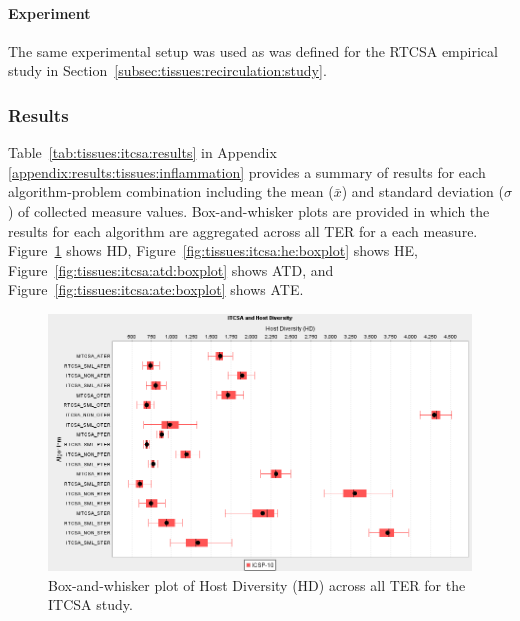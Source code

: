 \paragraph{Experiment}
The same experimental setup was used as was defined for the RTCSA empirical study in Section~\ref{subsec:tissues:recirculation:study}.

%
%
\subsubsection{Results}
Table~\ref{tab:tissues:itcsa:results} in Appendix \ref{appendix:results:tissues:inflammation} provides a summary of results for each algorithm-problem combination including the mean ($\bar{x}$) and standard deviation ($\sigma$) of collected measure values.  Box-and-whisker plots are provided in which the results for each algorithm are aggregated across all TER for a each measure. Figure~\ref{fig:tissues:itcsa:hd:boxplot} shows HD, Figure~\ref{fig:tissues:itcsa:he:boxplot} shows HE, Figure~\ref{fig:tissues:itcsa:atd:boxplot} shows ATD, and Figure~\ref{fig:tissues:itcsa:ate:boxplot} shows ATE.

\begin{figure}[htp]
	\centering
		\includegraphics[scale=0.80]{Tissues/ITCSA-HD}
	\caption{Box-and-whisker plot of Host Diversity (HD) across all TER for the ITCSA study.}
	\label{fig:tissues:itcsa:hd:boxplot}
\end{figure}

